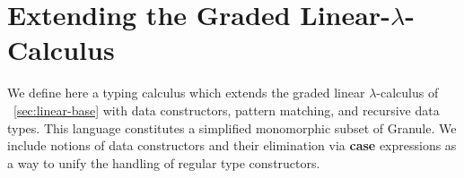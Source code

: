 %



\section{Extending the Graded Linear-$\lambda$-Calculus}
\label{sec:der-calculus}
We define here a typing calculus which extends the graded linear
$\lambda$-calculus of ~\ref{sec:linear-base} with data constructors, pattern
matching, and recursive data types. This language constitutes a simplified
monomorphic subset of Granule. We include notions of data constructors and their
elimination via \textbf{case} expressions as a way to unify the handling of
regular type constructors.

